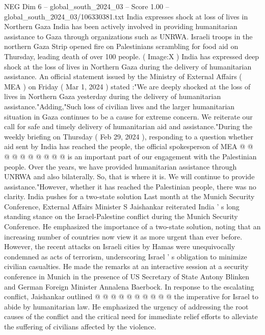 \begin{textsample}{NEG Dim 6 – global\_south\_2024\_03 – Score 1.00 – global\_south\_2024\_03/106330381.txt}  \label{ex:f6_neg_413}
India expresses shock at loss of lives in Northern Gaza India has been actively involved in providing humanitarian assistance to Gaza through organizations such as UNRWA.
Israeli troops in the northern Gaza Strip opened fire on Palestinians scrambling for food aid on Thursday, leading death of over 100 people. ( Image:X ) India has expressed deep shock at the loss of lives in Northern Gaza during the delivery of humanitarian assistance.
An official statement issued by the Ministry of External Affairs ( MEA ) on Friday ( Mar 1, 2024 ) stated :"We are deeply shocked at the loss of lives in Northern Gaza yesterday during the delivery of humanitarian assistance."Adding,"Such loss of civilian lives and the larger humanitarian situation in Gaza continues to be a cause for extreme concern.
We reiterate our call for safe and timely delivery of humanitarian aid and assistance."During the weekly briefing on Thursday ( Feb 29, 2024 ), responding to a question whether aid sent by India has reached the people, the official spokesperson of MEA @ @ @ @ @ @ @ @ @ @ is an important part of our engagement with the Palestinian people.
Over the years, we have provided humanitarian assistance through UNRWA and also bilaterally.
So, that is where it is.
We will continue to provide assistance."However, whether it has reached the Palestinian people, there was no clarity.
India pushes for a two-state solution Last month at the Munich Security Conference, External Affairs Minister S Jaishankar reiterated India ' s long standing stance on the Israel-Palestine conflict during the Munich Security Conference.
He emphasized the importance of a two-state solution, noting that an increasing number of countries now view it as more urgent than ever before.
However, the recent attacks on Israeli cities by Hamas were unequivocally condemned as acts of terrorism, underscoring Israel ' s obligation to minimize civilian casualties.
He made the remarks at an interactive session at a security conference in Munich in the presence of US Secretary of State Antony Blinken and German Foreign Minister Annalena Baerbock.
In response to the escalating conflict, Jaishankar outlined @ @ @ @ @ @ @ @ @ @ the imperative for Israel to abide by humanitarian law.
He emphasized the urgency of addressing the root causes of the conflict and the critical need for immediate relief efforts to alleviate the suffering of civilians affected by the violence.

\end{textsample}
